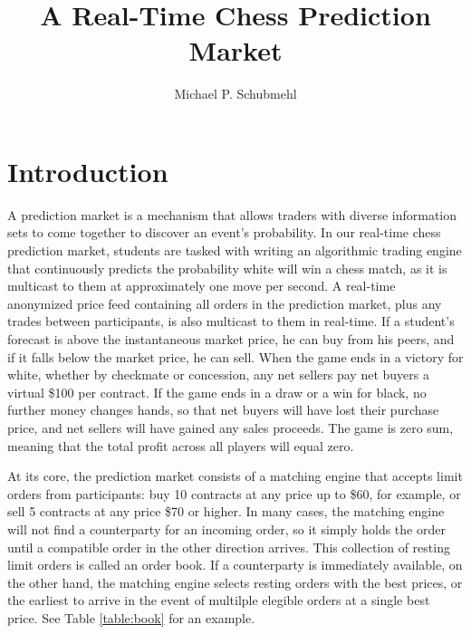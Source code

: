 \documentclass{article}
\begin{document}
\title{A Real-Time Chess Prediction Market}
\author{Michael P. Schubmehl}
\date{}

\maketitle

  

\section{Introduction}

A prediction market is a mechanism that allows traders with diverse information sets to come
together to discover an event's probability. In our real-time chess prediction market, students are
tasked with writing an algorithmic trading engine that continuously predicts the probability white
will win a chess match, as it is multicast to them at approximately one move per second. A real-time
anonymized price feed containing all orders in the prediction market, plus any trades between
participants, is also multicast to them in real-time. If a student's forecast is above the
instantaneous market price, he can buy from his peers, and if it falls below the market price, he
can sell. When the game ends in a victory for white, whether by checkmate or concession, any net
sellers pay net buyers a virtual \$100 per contract. If the game ends in a draw or a win for black,
no further money changes hands, so that net buyers will have lost their purchase price, and net
sellers will have gained any sales proceeds. The game is zero sum, meaning that the total profit
across all players will equal zero.

At its core, the prediction market consists of a matching engine that accepts limit orders from
participants: buy 10 contracts at any price up to \$60, for example, or sell 5 contracts at any
price \$70 or higher. In many cases, the matching engine will not find a counterparty for an
incoming order, so it simply holds the order until a compatible order in the other direction
arrives. This collection of resting limit orders is called an order book. If a counterparty is
immediately available, on the other hand, the matching engine selects resting orders with the best
prices, or the earliest to arrive in the event of multilple elegible orders at a single best
price. See Table \ref{table:book} for an example.
\end{document}
